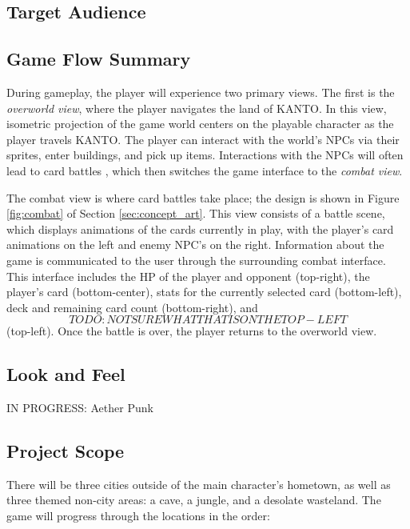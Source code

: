 \documentclass[12pt,titlepage]{article}
\newcommand\world{KANTO\xspace}
\begin{document}
\subsection{Target Audience}

\subsection{Game Flow Summary}

During gameplay, the player will experience two primary views. The first is the
{\it overworld view}, where the player navigates the land of \world. In this
view, isometric projection of the game world centers on the playable character
as the player travels \world. The player can interact with the world's NPCs via
their sprites, enter buildings, and pick up items. Interactions with the NPCs
will often lead to card battles , which then switches the game interface to the
{\it combat view}.

The combat view is where card battles take place; the design is shown in Figure
\ref{fig:combat} of Section \ref{sec:concept_art}. This view consists of a
battle scene, which displays animations of the cards currently in play, with the
player's card animations on the left and enemy NPC's on the right. Information
about the game is communicated to the user through the surrounding combat
interface. This interface includes the HP of the player and opponent
(top-right), the player's card (bottom-center), stats for the currently selected
card (bottom-left), deck and remaining card count (bottom-right), and \[TODO:
NOT SURE WHAT THAT IS ON THE TOP-LEFT\] (top-left). Once the battle is over, the
player returns to the overworld view.

\subsection{Look and Feel}
IN PROGRESS: Aether Punk

\subsection{Project Scope}
%

There will be three cities outside of the main character's hometown, as well as
three themed non-city areas: a cave, a jungle, and a desolate wasteland. The
game will progress through the locations in the order:
\end{document}
